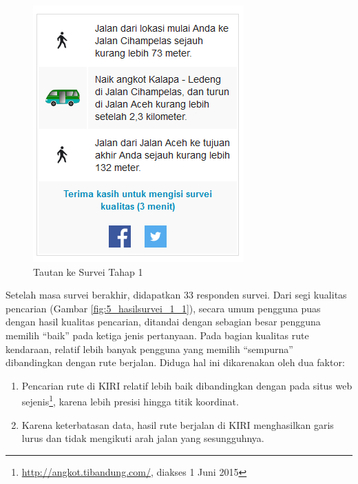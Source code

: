 \begin{figure}
	\centering
	\includegraphics[scale=0.75]{Gambar/5_survei_1}
	\caption{Tautan ke Survei Tahap 1} 
	\label{fig:5_survei_1}
\end{figure}

Setelah masa survei berakhir, didapatkan 33 responden survei. Dari segi kualitas pencarian (Gambar \ref{fig:5_hasilsurvei_1_1}), secara umum pengguna puas dengan hasil kualitas pencarian, ditandai dengan sebagian besar pengguna memilih ``baik'' pada ketiga jenis pertanyaan. Pada bagian kualitas rute kendaraan, relatif lebih banyak pengguna yang memilih ``sempurna'' dibandingkan dengan rute berjalan. Diduga hal ini dikarenakan oleh dua faktor:

\begin{enumerate}
	\item Pencarian rute di KIRI relatif lebih baik dibandingkan dengan pada situs web sejenis\footnote{\url{http://angkot.tibandung.com/}, diakses 1 Juni 2015}, karena lebih presisi hingga titik koordinat.
	\item Karena keterbatasan data, hasil rute berjalan di KIRI menghasilkan garis lurus dan tidak mengikuti arah jalan yang sesungguhnya.
\end{enumerate}

